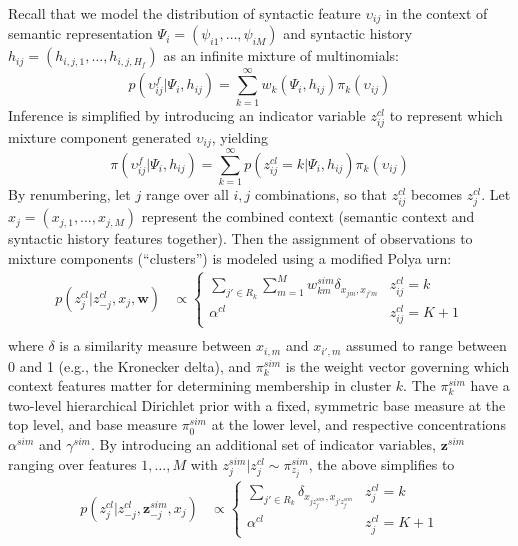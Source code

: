\documentclass[12pt]{article}
\begin{document}
Recall that we model the distribution of syntactic feature $\upsilon_{ij}$ in the context of semantic representation $\Psi_i = (\psi_{i1}, \dots, \psi_{iM})$ and syntactic history $h_{ij} = (h_{i,j,1}, \dots, h_{i,j,H_f})$ as an infinite mixture of multinomials:
\begin{equation}
  \label{eq:13}
  p(\upsilon^f_{ij} \vert \Psi_i, h_{ij}) = \sum_{k=1}^\infty w_{k}(\Psi_i, h_{ij}) \pi_k(\upsilon_{ij})
\end{equation}
Inference is simplified by introducing an indicator variable $z^{cl}_{ij}$ to represent which mixture component generated $\upsilon_{ij}$, yielding
\begin{equation}
  \label{eq:13}
  \pi(\upsilon^f_{ij} \vert \Psi_i, h_{ij}) = \sum_{k=1}^\infty p(z^{cl}_{ij} = k \vert \Psi_i, h_{ij}) \pi_k(\upsilon_{ij})
\end{equation} By renumbering, let $j$ range over all $i,j$ combinations, so that $z^{cl}_{ij}$ becomes $z^{cl}_j$.  Let $x_{j} = (x_{j,1}, \dots, x_{j,M})$ represent the combined context (semantic context and syntactic history features together).  Then the assignment of observations to mixture components (``clusters'') is modeled using a modified Polya urn:
\begin{align}
p(z^{cl}_{j} \vert z^{cl}_{-j}, x_{j}, \mathbf{w}) &\propto
  \begin{cases}
    \sum_{j' \in R_k} \sum_{m=1}^M w_{km}^{sim} \delta_{x_{jm},x_{j'm}} & z^{cl}_{ij} = k \\
    \alpha^{cl} & z^{cl}_{ij} = K+1
  \end{cases} \\
\end{align}
where $\delta$ is a similarity measure between $x_{i,m}$ and $x_{i',m}$ assumed to range between 0 and 1 (e.g., the Kronecker delta), and $\pi^{sim}_k$ is the weight vector governing which context features matter for determining membership in cluster $k$.  The $\pi^{sim}_k$ have a two-level hierarchical Dirichlet prior with a fixed, symmetric base measure at the top level, and base measure $\pi^{sim}_0$ at the lower level, and respective concentrations $\alpha^{sim}$ and $\gamma^{sim}$.  By introducing an additional set of indicator variables, $\mathbf{z}^{sim}$ ranging over features $1, \dots, M$ with $z^{sim}_j \vert z^{cl}_j \sim \pi^{sim}_{z_j}$, the above simplifies to
\begin{align}
  \label{eq:5}
  p(z^{cl}_{j} \vert z^{cl}_{-j}, \mathbf{z}^{sim}_{-j}, x_{j}) &\propto
  \begin{cases}
    \sum_{j' \in R_k} \delta_{x_{jz^{sim}_{j'}},x_{j'z^{sim}_{j'}}} & z^{cl}_{j} = k \\
    \alpha^{cl} & z^{cl}_{j} = K+1
  \end{cases}
\end{align}
\end{document}
